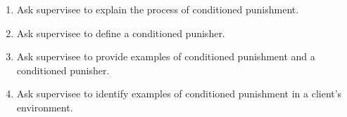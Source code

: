 %
\begin{enumerate}
\item Ask supervisee to explain the process of conditioned punishment.
\item Ask supervisee to define a conditioned punisher.
\item Ask supervisee to provide examples of conditioned punishment and a conditioned punisher.
\item Ask supervisee to identify examples of conditioned punishment in a client's environment.
\end{enumerate}
%
